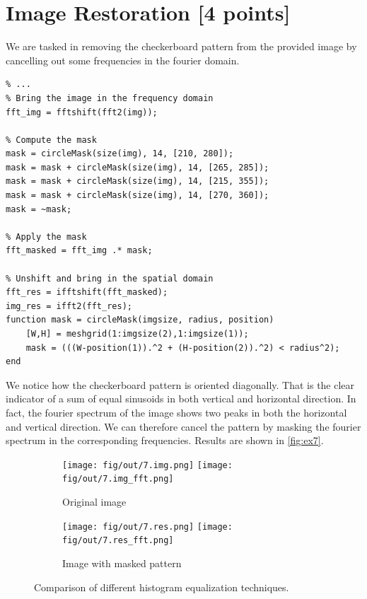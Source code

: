 \documentclass[tikz,14pt,fleqn]{article}
\begin{document}
\section{Image Restoration [4 points]}
We are tasked in removing the checkerboard pattern from the provided image by cancelling out some frequencies in the fourier domain.
\begin{verbatim} 
% ...
% Bring the image in the frequency domain
fft_img = fftshift(fft2(img));

% Compute the mask
mask = circleMask(size(img), 14, [210, 280]);
mask = mask + circleMask(size(img), 14, [265, 285]);
mask = mask + circleMask(size(img), 14, [215, 355]);
mask = mask + circleMask(size(img), 14, [270, 360]);
mask = ~mask;

% Apply the mask
fft_masked = fft_img .* mask;

% Unshift and bring in the spatial domain
fft_res = ifftshift(fft_masked);
img_res = ifft2(fft_res);
function mask = circleMask(imgsize, radius, position)
    [W,H] = meshgrid(1:imgsize(2),1:imgsize(1));
    mask = (((W-position(1)).^2 + (H-position(2)).^2) < radius^2);
end
\end{verbatim}
We notice how the checkerboard pattern is oriented diagonally. That is the clear indicator of a sum of equal sinusoids in both vertical and horizontal direction. In fact, the fourier spectrum of the image shows two peaks in both the horizontal and vertical direction. We can therefore cancel the pattern by masking the fourier spectrum in the corresponding frequencies. Results are shown in \autoref{fig:ex7}.
\begin{figure}[h!]
    \centering
    \begin{subfigure}{0.27\textwidth}
        \centering
        \texttt{[image: fig/out/7.img.png]}
        \texttt{[image: fig/out/7.img\_fft.png]}
        \caption{Original image}
    \end{subfigure}
    \begin{subfigure}{0.27\textwidth}
        \centering
        \texttt{[image: fig/out/7.res.png]}
        \texttt{[image: fig/out/7.res\_fft.png]}
        \caption{Image with masked pattern}
    \end{subfigure}
    \caption{Comparison of different histogram equalization techniques.}
    \label{fig:ex7}
\end{figure}
\end{document}
